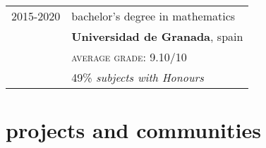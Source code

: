 \documentclass[a4paper,10pt]{article} %
\begin{document}
\begin{tabular}{rl}
2015-2020 & bachelor's degree in mathematics\\
& \textbf{Universidad de Granada}, spain\\
&\normalsize \textsc{average grade}: 9.10/10\\
& 49\% \small\emph{subjects with Honours}\\
\end{tabular}


\section{projects and communities}
\end{document}
